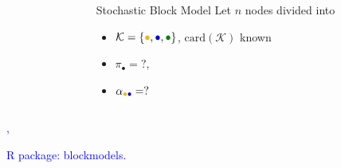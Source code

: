 \documentclass[compress,10pt]{beamer}
\begin{document}
\begin{frame}
\begin{center}
\begin{overlayarea}{\textwidth}{.5\textheight}
\begin{columns}
\begin{column}{.45\paperwidth}
        \end{column}
        \begin{column}{.5\paperwidth}
          \begin{small}
            \begin{block}{Stochastic Block Model}
              Let $n$ nodes divided into
              \begin{itemize}
              \item
                $\mathcal{K}=\{\textcolor{yellow!40!orange}{\bullet},\textcolor{blue!80!black}{\bullet},\textcolor{green!50!black}{\bullet}\}$,
                $\text{card}(\mathcal{K})$ known
              \item  $\pi_\bullet  =  ?$,
              \item      $\alpha_{\textcolor{yellow!40!orange}{\bullet}\textcolor{blue!80!black}{\bullet}}     =      ?$
              \end{itemize}
            \end{block}
          \end{small}
        \end{column}
      \end{columns}
    \end{overlayarea}
    \end{center}
    \medskip

    
    \textcolor{blue}{\cite{nowickiSnijders2001}, \cite{daudin2008mixture}}
    
    \bigskip
    
\textcolor{blue}{R package: blockmodels.}
%     

\end{frame}
\end{document}
